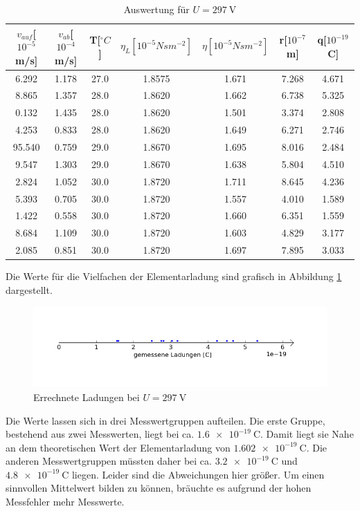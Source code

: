 \documentclass[11pt,ngerman,a4paper]{article}
\begin{document}
\begin{table}[H]
\hspace{-1cm}
\begin{tabular}{ccccccc}
\toprule
{$v_{auf}$[$10^{-5}$m/s]} &{ $v_{ab}$[$10^{-4}$m/s]} &{ T[$^\circ C$]} &{ $\eta_{L}[10^{-5}Nsm^{-2}]$} &{ $\eta[10^{-5}Nsm^{-2}]$} &{ r[$10^{-7}$m]} &{ q[$10^{-19}$C] }\\
\midrule
6.292 & 1.178 & 27.0 & 1.8575 & 1.671 & 7.268 & 4.671\\
8.865 & 1.357 & 28.0 & 1.8620 & 1.662 & 6.738 & 5.325\\
0.132 & 1.435 & 28.0 & 1.8620 & 1.501 & 3.374 & 2.808\\
4.253 & 0.833 & 28.0 & 1.8620 & 1.649 & 6.271 & 2.746\\
95.540 & 0.759 & 29.0 & 1.8670 & 1.695 & 8.016 & 2.484\\
9.547 & 1.303 & 29.0 & 1.8670 & 1.638 & 5.804 & 4.510\\
2.824 & 1.052 & 30.0 & 1.8720 & 1.711 & 8.645 & 4.236\\
5.393 & 0.705 & 30.0 & 1.8720 & 1.557 & 4.010 & 1.589\\
1.422 & 0.558 & 30.0 & 1.8720 & 1.660 & 6.351 & 1.559\\
8.684 & 1.109 & 30.0 & 1.8720 & 1.603 & 4.829 & 3.177\\
2.085 & 0.851 & 30.0 & 1.8720 & 1.697 & 7.895 & 3.033\\
\bottomrule
\end{tabular}
\label{}
\caption{Auswertung für $U=\SI{297}{\volt}$}
\end{table}
\noindent
Die Werte für die Vielfachen der Elementarladung sind grafisch in Abbildung \ref{plot1a} dargestellt.
\begin{figure}[h]
\hspace{-1.5cm}
\includegraphics[scale=0.9]{plot1a.png}
\caption{Errechnete Ladungen bei $U=\SI{297}{\volt}$}
\label{plot1a}
\end{figure}
Die Werte lassen sich in drei Messwertgruppen aufteilen. Die erste Gruppe, bestehend aus zwei Messwerten, liegt bei ca. $\SI{1.6e-19}{\coulomb}$. Damit liegt sie Nahe an dem theoretischen Wert der Elementarladung von  $\SI{1.602e-19}{\coulomb}$. Die anderen Messwertgruppen müssten daher bei ca.  $\SI{3.2e-19}{\coulomb}$ und  $\SI{4.8e-19}{\coulomb}$ liegen. Leider sind die Abweichungen hier größer. Um einen sinnvollen Mittelwert bilden zu können, bräuchte es aufgrund der hohen Messfehler mehr Messwerte. 
\end{document}
